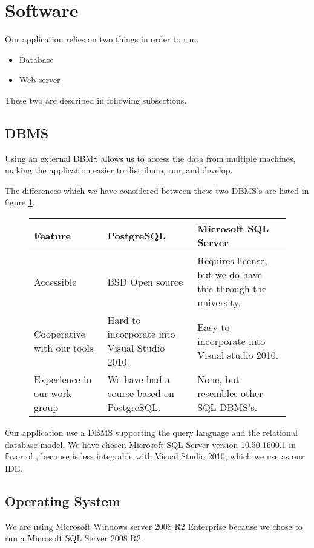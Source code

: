 \section{Software}
\label{sec:software}

Our application relies on two things in order to run:

\begin{itemize}
	\item Database
	\item Web server
\end{itemize}

These two are described in following subsections.

\subsection{DBMS}
\label{subsec:dbms}

Using an external DBMS allows us to access the data from multiple machines, making the application easier to distribute, run, and develop.

The differences which we have considered between these two DBMS's are listed in figure \ref{fig:DBMS}. \cite{postgres08}

\begin{figure}[p]
	\centering
		\begin{tabularx}{\textwidth}{L|L|L}
			\textbf{Feature}&\textbf{PostgreSQL}&\textbf{Microsoft SQL Server} \\
			\hline
			Accessible&BSD Open source&Requires license, but we do have this through the university. \\ 
			Cooperative with our tools&Hard to incorporate into Visual Studio 2010. & Easy to incorporate into Visual studio 2010. \\ 
			Experience in our work group&We have had a course based on PostgreSQL. & None, but resembles other SQL DBMS's. \\ 
		\end{tabularx}
	\label{fig:DBMS}
\end{figure}

Our application use a DBMS supporting the query language \sql[] and the relational database model\cite{Sudershan2011}.
We have chosen Microsoft SQL Server version 10.50.1600.1 in favor of \posgresql[], because \posgresql[] is less integrable with Visual Studio 2010, which we use as our IDE.

\subsection{Operating System}
\label{subsec:operating_system}
We are using Microsoft Windows server 2008 R2 Enterprise because we chose to run a Microsoft SQL Server 2008 R2. 

